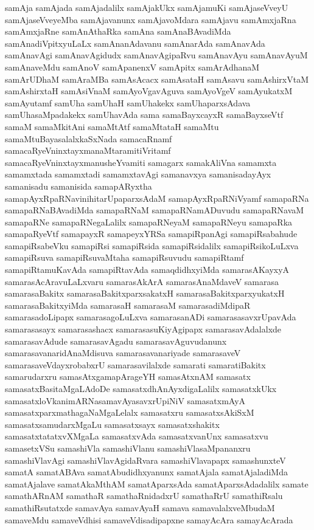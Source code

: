 {samAja
samAjada
samAjadalilx
samAjakUkx
samAjamuKi
samAjaseVveyU
samAjaseVveyeMba
samAjavanunx
samAjavoMdara
samAjavu
samAmxjaRna
samAmxjaRne
samAnAthaRka
samAna
samAnaBAvadiMda
samAnadiVpitxyuLaLx
samAnanAdavanu
samAnarAda
samAnavAda
samAnavAgi
samAnavAgidudx
samAnavAgipaRvu
samAnavAyu
samAnavAyuM
samAnaveMdu
samAnoV
samApanenxV
samApitx
samArAdhanaM
samArUDhaM
samAraMBa
samAsAcacx
samAsataH
samAsavu
samAshirxVtaM
samAshirxtaH
samAsiVnaM
samAyoVgavAguva
samAyoVgeV
samAyukatxM
samAyutamf
samUha
samUhaH
samUhakekx
samUhaparxsAdava
samUhasaMpadakekx
samUhavAda
sama
samaBayxcayxR
samaBayxseVtf
samaM
samaMkitAni
samaMtAtf
samaMtataH
samaMtu
samaMtuBayasalalxkaSxNada
samacaRnamf
samacaRyeVninxtayxmanaMtaramitiVritamf
samacaRyeVninxtayxmanusheYvamiti
samagarx
samakAliVna
samamxta
samamxtada
samamxtadi
samamxtavAgi
samanavxya
samanisadayAyx
samanisadu
samanisida
samapARyxtha
samapAyxRpaRNavinihitarUpaparxsAdaM
samapAyxRpaRNiVyamf
samapaRNa
samapaRNaBAvadiMda
samapaRNaM
samapaRNamADuvudu
samapaRNavaM
samapaRNe
samapaRNegaLalilx
samapaRNeyaM
samapaRNeyu
samapaRka
samapaRyeVtf
samapayxR
samapeyxYRSa
samapiRpanAgi
samapiRsabahude
samapiRsabeVku
samapiRsi
samapiRsida
samapiRsidalilx
samapiRsikoLuLxva
samapiRsuva
samapiRsuvaMtaha
samapiRsuvudu
samapiRtamf
samapiRtamuKavAda
samapiRtavAda
samaqdidhxyiMda
samarasAKayxyA
samarasAcAravuLaLxvaru
samarasAkArA
samarasAnaMdaveV
samarasa
samarasaBakitx
samarasaBakitxparxsakatxH
samarasaBakitxparxyukatxH
samarasaBakitxyiMda
samarasaH
samarasaM
samarasadiMdipaR
samarasadoLipapx
samarasagoLuLxva
samarasanADi
samarasasavxrUpavAda
samarasasayx
samarasashacx
samarasasuKiyAgipapx
samarasavAdalalxde
samarasavAdude
samarasavAgadu
samarasavAguvudanunx
samarasavanaridAnaMdisuva
samarasavanariyade
samarasaveV
samarasaveVdayxrobabxrU
samarasavilalxde
samarati
samaratiBakitx
samarudarxru
samasAtxgamapArageYH
samasAtxnAM
samasatx
samasatxBasitaMgaLAdoDe
samasatxdhAnAyxdigaLalilx
samasatxkUkx
samasatxloVkanimARNasamavAyasavxrUpiNiV
samasatxmAyA
samasatxparxmathagaNaMgaLelalx
samasatxru
samasatxsAkiSxM
samasatxsamudarxMgaLu
samasatxsayx
samasatxshakitx
samasatxtatatxvXMgaLa
samasatxvAda
samasatxvanUnx
samasatxvu
samasetxVSu
samashiVla
samashiVlanu
samashiVlasaMpananxru
samashiVlavAgi
samashiVlavAgidaRvara
samashiVlavapapx
samashunxteV
samatA
samatABAva
samatAbudidhxyanunx
samatAjala
samatAjaladiMda
samatAjalave
samatAkaMthAM
samatAparxsAda
samatAparxsAdadalilx
samate
samathARnAM
samathaR
samathaRnidadxrU
samathaRrU
samathiRsalu
samathiRsutatxde
samavAya
samavAyaH
samava
samavalalxveMbudaM
samaveMdu
samaveVdhisi
samaveVdisadipapxne
samayAcAra
samayAcArada
}
